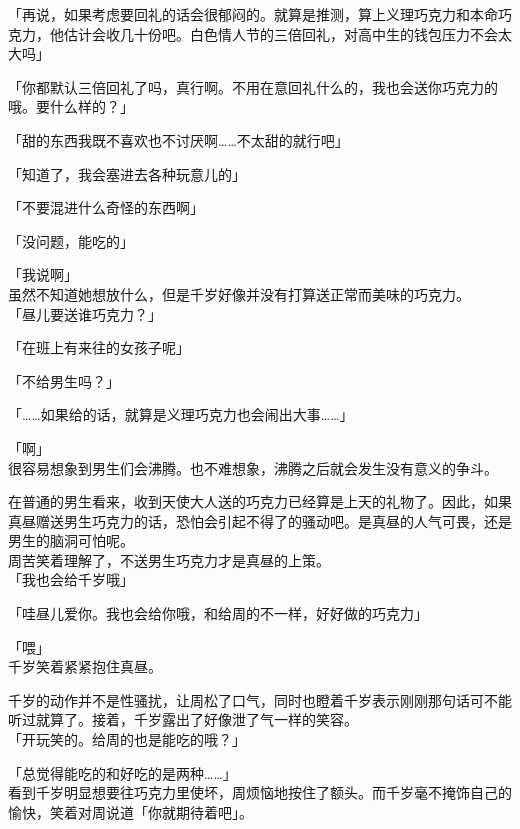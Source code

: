 「再说，如果考虑要回礼的话会很郁闷的。就算是推测，算上义理巧克力和本命巧克力，他估计会收几十份吧。白色情人节的三倍回礼，对高中生的钱包压力不会太大吗」

「你都默认三倍回礼了吗，真行啊。不用在意回礼什么的，我也会送你巧克力的哦。要什么样的？」

「甜的东西我既不喜欢也不讨厌啊……不太甜的就行吧」

「知道了，我会塞进去各种玩意儿的」

「不要混进什么奇怪的东西啊」

「没问题，能吃的」

「我说啊」\\

虽然不知道她想放什么，但是千岁好像并没有打算送正常而美味的巧克力。\\

「昼儿要送谁巧克力？」

「在班上有来往的女孩子呢」

「不给男生吗？」

「……如果给的话，就算是义理巧克力也会闹出大事……」

「啊」\\

很容易想象到男生们会沸腾。也不难想象，沸腾之后就会发生没有意义的争斗。

在普通的男生看来，收到天使大人送的巧克力已经算是上天的礼物了。因此，如果真昼赠送男生巧克力的话，恐怕会引起不得了的骚动吧。是真昼的人气可畏，还是男生的脑洞可怕呢。\\

周苦笑着理解了，不送男生巧克力才是真昼的上策。\\

「我也会给千岁哦」

「哇昼儿爱你。我也会给你哦，和给周的不一样，好好做的巧克力」

「喂」\\

千岁笑着紧紧抱住真昼。

千岁的动作并不是性骚扰，让周松了口气，同时也瞪着千岁表示刚刚那句话可不能听过就算了。接着，千岁露出了好像泄了气一样的笑容。\\

「开玩笑的。给周的也是能吃的哦？」

「总觉得能吃的和好吃的是两种……」\\

看到千岁明显想要往巧克力里使坏，周烦恼地按住了额头。而千岁毫不掩饰自己的愉快，笑着对周说道「你就期待着吧」。
